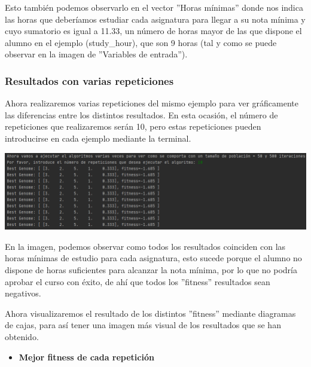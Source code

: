 \documentclass[11pt, a4paper, titlepage]{article}
\begin{document}
Esto también podemos observarlo en el vector ''Horas mínimas'' donde nos indica las horas que deberíamos estudiar cada asignatura para llegar a su nota mínima y cuyo sumatorio es igual a 11.33, un número de horas mayor de las que dispone el alumno en el ejemplo (study\_hour), que son 9 horas (tal y como se puede observar en la imagen de ''Variables de entrada'').


\subsubsection{Resultados con varias repeticiones}
Ahora realizaremos varias repeticiones del mismo ejemplo para ver gráficamente las diferencias entre los distintos resultados. En esta ocasión, el número de repeticiones que realizaremos serán 10, pero estas repeticiones pueden introducirse en cada ejemplo mediante la terminal.

\vspace{5mm}

\includegraphics[scale=0.6]{img/Res2_horas_insuf.png}

\vspace{5mm}

En la imagen, podemos observar como todos los resultados coinciden con las horas mínimas de estudio para cada asignatura, esto sucede porque el alumno no dispone de horas suficientes para alcanzar la nota mínima, por lo que no podría aprobar el curso con éxito, de ahí que todos los ''fitness'' resultados sean negativos.

\vspace{5mm}

Ahora visualizaremos el resultado de los distintos ''fitness'' mediante diagramas de cajas, para así tener una imagen más visual de los resultados que se han obtenido.

\newpage

\begin{itemize}
\item \textbf{Mejor fitness de cada repetición}
\end{itemize}
\end{document}
